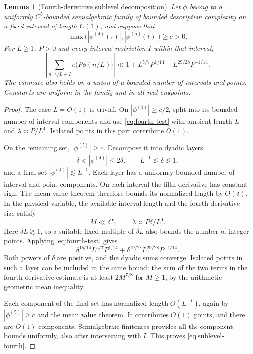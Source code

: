 \documentclass[11pt,a4paper]{article}
\numberwithin{equation}{section}
\newtheorem{lemma}[theorem]{Lemma}
\theoremstyle{remark}
\begin{document}
\begin{lemma}[Fourth-derivative sublevel decomposition]\label{lem:sublevel-fourth}
Let $\phi$ belong to a uniformly $C^5$-bounded semialgebraic family of
bounded description complexity on a fixed interval of length $O(1)$, and
suppose that
\[
 \max\bigl(|\phi^{(4)}(t)|,|\phi^{(5)}(t)|\bigr)\ge c>0.
\]
For $L\ge1$, $P>0$ and every interval restriction $I$ within that interval,
\begin{equation}\label{eq:sublevel-fourth}
 \left|\sum_{n:\,n/L\in I}e\bigl(P\phi(n/L)\bigr)\right|
 \ll 1+L^{5/7}P^{1/14}+L^{29/28}P^{-1/14}.
\end{equation}
The estimate also holds on a union of a bounded number of intervals and
points. Constants are uniform in the family and in all real endpoints.
\end{lemma}
\begin{proof}
The case $L=O(1)$ is trivial. On $|\phi^{(4)}|\ge c/2$, split into its
bounded number of interval components and use \eqref{eq:fourth-test}
with ambient length $L$ and $\lambda\asymp P/L^4$. Isolated points in
this part contribute $O(1)$.

On the remaining set, $|\phi^{(5)}|\ge c$. Decompose it into dyadic
layers
\[
 \delta<|\phi^{(4)}|\le2\delta,\qquad
 L^{-1}\lesssim\delta\lesssim1,
\]
and a final set $|\phi^{(4)}|\lesssim L^{-1}$. Each layer has a uniformly
bounded number of interval and point components. On each interval the
fifth derivative has constant sign. The mean value theorem therefore
bounds its normalized length by $O(\delta)$. In the physical variable,
the available interval length and the fourth derivative size satisfy
\[
 M\ll\delta L,\qquad \lambda\asymp P\delta/L^4.
\]
Here $\delta L\gtrsim1$, so a suitable fixed multiple of $\delta L$
also bounds the number of integer points. Applying \eqref{eq:fourth-test}
gives
\begin{equation}\label{eq:sublevel-layer}
 \delta^{15/14}L^{5/7}P^{1/14}
 +\delta^{19/28}L^{29/28}P^{-1/14}.
\end{equation}
Both powers of $\delta$ are positive, and the dyadic sums converge.
Isolated points in such a layer can be included in the same bound:
the sum of the two terms in the fourth-derivative estimate is at least
$2M^{7/8}$ for $M\ge1$, by the arithmetic--geometric mean inequality.

Each component of the final set has normalized length $O(L^{-1})$,
again by $|\phi^{(5)}|\ge c$ and the mean value theorem. It contributes
$O(1)$ points, and there are $O(1)$ components. Semialgebraic finiteness
provides all the component bounds uniformly, also after intersecting
with $I$. This proves \eqref{eq:sublevel-fourth}.
\end{proof}
\end{document}

